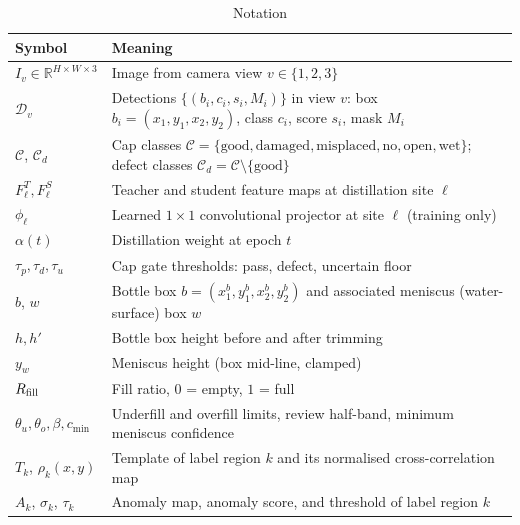 \begin{table}[htbp]
\centering
\caption{Notation}
\label{tab:notation}
\begin{tabularx}{\textwidth}{|L{3.4cm}|X|}
\hline
\textbf{Symbol} & \textbf{Meaning} \\ \hline
$I_v \in \mathbb{R}^{H\times W\times 3}$ & Image from camera view $v\in\{1,2,3\}$ \\ \hline
$\mathcal{D}_v$ & Detections $\{(b_i,c_i,s_i,M_i)\}$ in view $v$: box $b_i=(x_1,y_1,x_2,y_2)$, class $c_i$, score $s_i$, mask $M_i$ \\ \hline
$\mathcal{C}$, $\mathcal{C}_d$ & Cap classes $\mathcal{C}=\{\text{good},\text{damaged},\text{misplaced},\text{no},\text{open},\text{wet}\}$; defect classes $\mathcal{C}_d=\mathcal{C}\setminus\{\text{good}\}$ \\ \hline
$F^T_\ell, F^S_\ell$ & Teacher and student feature maps at distillation site $\ell$ \\ \hline
$\phi_\ell$ & Learned $1{\times}1$ convolutional projector at site $\ell$ (training only) \\ \hline
$\alpha(t)$ & Distillation weight at epoch $t$ \\ \hline
$\tau_p,\tau_d,\tau_u$ & Cap gate thresholds: pass, defect, uncertain floor \\ \hline
$b$, $w$ & Bottle box $b=(x^b_1,y^b_1,x^b_2,y^b_2)$ and associated meniscus (water-surface) box $w$ \\ \hline
$h, h'$ & Bottle box height before and after trimming \\ \hline
$y_w$ & Meniscus height (box mid-line, clamped) \\ \hline
$R_{\mathrm{fill}}$ & Fill ratio, $0$ = empty, $1$ = full \\ \hline
$\theta_u,\theta_o,\beta,c_{\min}$ & Underfill and overfill limits, review half-band, minimum meniscus confidence \\ \hline
$T_k$, $\rho_k(x,y)$ & Template of label region $k$ and its normalised cross-correlation map \\ \hline
$A_k$, $\sigma_k$, $\tau_k$ & Anomaly map, anomaly score, and threshold of label region $k$ \\ \hline
\end{tabularx}
\end{table}

